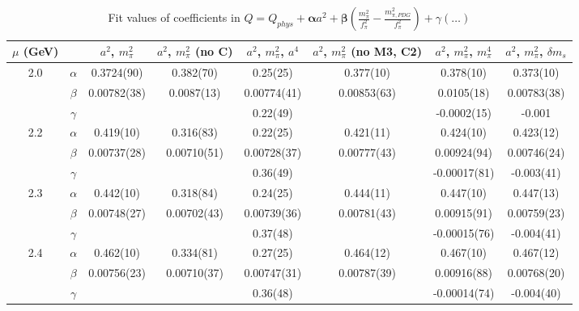 \documentclass[12pt]{extarticle}
\begin{document}
\begin{table}[h!]
\begin{center}
\begin{tabular}{|c c|c|c|c|c|c|c|}
\hline
$\mu$ (GeV) &  & $a^2$, $m_\pi^2$& $a^2$, $m_\pi^2$ (no C)& $a^2$, $m_\pi^2$, $a^4$& $a^2$, $m_\pi^2$ (no M3, C2)& $a^2$, $m_\pi^2$, $m_\pi^4$& $a^2$, $m_\pi^2$, $\delta m_s$\\
\hline
\multirow{3}{0.5in}{2.0} & $\alpha$ & 0.3724(90)& 0.382(70)& 0.25(25)& 0.377(10)& 0.378(10)& 0.373(10)\\
 & $\beta$ & 0.00782(38)& 0.0087(13)& 0.00774(41)& 0.00853(63)& 0.0105(18)& 0.00783(38)\\
 & $\gamma$ &  &  & 0.22(49)&  & -0.0002(15)& -0.001\\
\hline
\multirow{3}{0.5in}{2.2} & $\alpha$ & 0.419(10)& 0.316(83)& 0.22(25)& 0.421(11)& 0.424(10)& 0.423(12)\\
 & $\beta$ & 0.00737(28)& 0.00710(51)& 0.00728(37)& 0.00777(43)& 0.00924(94)& 0.00746(24)\\
 & $\gamma$ &  &  & 0.36(49)&  & -0.00017(81)& -0.003(41)\\
\hline
\multirow{3}{0.5in}{2.3} & $\alpha$ & 0.442(10)& 0.318(84)& 0.24(25)& 0.444(11)& 0.447(10)& 0.447(13)\\
 & $\beta$ & 0.00748(27)& 0.00702(43)& 0.00739(36)& 0.00781(43)& 0.00915(91)& 0.00759(23)\\
 & $\gamma$ &  &  & 0.37(48)&  & -0.00015(76)& -0.004(41)\\
\hline
\multirow{3}{0.5in}{2.4} & $\alpha$ & 0.462(10)& 0.334(81)& 0.27(25)& 0.464(12)& 0.467(10)& 0.467(12)\\
 & $\beta$ & 0.00756(23)& 0.00710(37)& 0.00747(31)& 0.00787(39)& 0.00916(88)& 0.00768(20)\\
 & $\gamma$ &  &  & 0.36(48)&  & -0.00014(74)& -0.004(40)\\
\hline
\end{tabular}
\caption{Fit values of coefficients in $Q = Q_{phys} + \mathbf{\alpha} a^2 + \mathbf{\beta}\left(\frac{m_\pi^2}{f_\pi^2}-\frac{m_{\pi,PDG}^2}{f_\pi^2}\right) + \gamma(\ldots)$}
\end{center}
\end{table}







\end{document}
